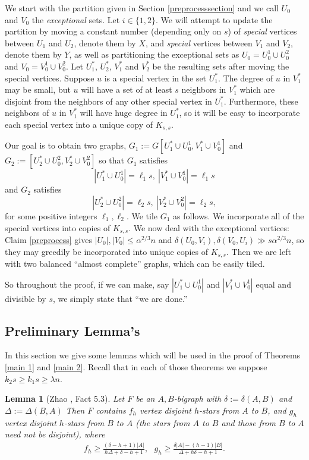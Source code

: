 \documentclass[oneside,12pt]{memoir}
\newtheorem{lemma}[theorem]{Lemma}
\begin{document}
We start with the partition given in Section \ref{preprocesssection} and we call $U_0$ and $V_0$ the \emph{exceptional} sets. Let $i\in \{1,2\}$. We will attempt to update the partition by moving a constant number (depending only on $s$) of \emph{special} vertices between $U_1$ and $U_2$, denote them by $X$, and \emph{special} vertices between $V_1$ and $V_2$, denote them by $Y$, as well as partitioning the exceptional sets as $U_0=U_0^1\cup U_0^2$ and $V_0=V_0^1\cup V_0^2$. Let $U_1^*$, $U_2^*$, $V_1^*$ and $V_2^*$ be the resulting sets after moving the special vertices. %
Suppose $u$ is a special vertex in the set $U_1^*$.  The degree of $u$ in $V_1^*$ may be small, but $u$ will have a set of at least $s$ neighbors in $V_1^*$ which are disjoint from the neighbors of any other special vertex in $U_1^*$.  Furthermore, these neighbors of $u$ in $V_1^*$ will have huge degree in $U_1^*$, so it will be easy to incorporate each special vertex into a unique copy of $K_{s,s}$.

Our goal is to obtain two graphs, $G_1:=G[U_1^*\cup U_0^1, V_1^*\cup V_0^1]$ and $G_2:=[U_2^*\cup U_0^2, V_2^*\cup V_0^2]$ so that $G_1$ satisfies $$|U_1^*\cup U_0^1|=\ell_1s,~ |V_1^*\cup V_0^1|=\ell_1s$$ and $G_2$ satisfies $$|U_2^*\cup U_0^2|=\ell_2s,~ |V_2^*\cup V_0^2|=\ell_2s,$$ for some positive integers $\ell_1,\ell_2$.  We tile $G_1$ as follows.  We incorporate all of the special vertices into copies of $K_{s,s}$.  We now deal with the exceptional vertices: Claim \ref{preprocess} gives $|U_0|, |V_0|\leq \alpha^{2/3}n$ and $\delta(U_0, V_i), \delta(V_0, U_i)\gg s\alpha^{2/3}n$, so they may greedily be incorporated into unique copies of $K_{s,s}$. Then we are left with two balanced ``almost complete'' graphs, which can be easily tiled.

So throughout the proof, if we can make, say $|U_1^*\cup U_0^1|$ and $|V_1^*\cup V_0^1|$ equal and divisible by $s$, we simply state that ``we are done.''


\subsection{Preliminary Lemma's}

In this section we give some lemmas which will be used in the proof of Theorems \ref{main 1} and \ref{main 2}.  Recall that in each of those theorems we suppose $k_2s\geq k_1s\geq \lambda n$.  


\begin{lemma}[Zhao \cite{Z}, Fact 5.3]\label{Zhao lemma}
Let $F$ be an $A,B$-bigraph with $\delta:=\delta(A,B)$ and $\Delta:=\Delta(B,A)$ 
Then $F$ contains $f_h$ vertex disjoint $h$-stars from $A$ to $B$, and $g_h$ vertex disjoint $h$-stars from $B$ to $A$ (the stars from $A$ to $B$ and those from $B$ to $A$ need not be disjoint), where
\begin{align*}
f_h\geq\frac{(\delta-h+1)|A|}{h\Delta+\delta-h+1}, ~~~ g_h\geq\frac{\delta|A|-(h-1)|B|}{\Delta+h\delta-h+1}.
\end{align*}

\end{lemma}
\end{document}
